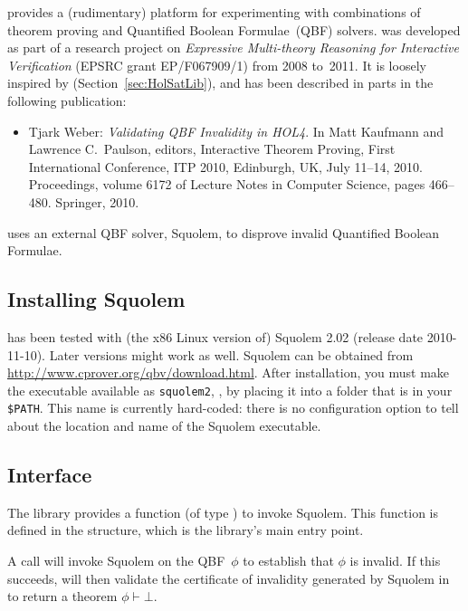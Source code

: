 
\setcounter{sessioncount}{0}

 provides a (rudimentary) platform for experimenting
with combinations of theorem proving and Quantified Boolean
Formulae~(QBF) solvers.   was developed as part of a
research project on {\it Expressive Multi-theory Reasoning for
  Interactive Verification} (EPSRC grant EP/F067909/1) from 2008
to~2011.  It is loosely inspired by 
(Section~\ref{sec:HolSatLib}), and has been described in parts in the
following publication:
\begin{itemize}
\item Tjark Weber: {\it Validating QBF Invalidity in HOL4}.  In Matt
  Kaufmann and Lawrence C.\ Paulson, editors, Interactive Theorem
  Proving, First International Conference, ITP 2010, Edinburgh, UK,
  July 11--14, 2010.  Proceedings, volume 6172 of Lecture Notes in
  Computer Science, pages 466--480.  Springer, 2010.
\end{itemize}
 uses an external QBF solver, Squolem, to disprove
invalid Quantified Boolean Formulae.

\subsection{Installing Squolem}

 has been tested with (the x86 Linux version of) Squolem
2.02 (release date 2010-11-10).  Later versions might work as well.
Squolem can be obtained from
\url{http://www.cprover.org/qbv/download.html}.  After installation,
you must make the executable available as {\tt squolem2}, \eg, by
placing it into a folder that is in your {\tt \$PATH}.  This name is
currently hard-coded: there is no configuration option to tell \HOL{}
about the location and name of the Squolem executable.

\subsection{Interface}
\label{qbf-interface}

The library provides a function  (of type ) to invoke Squolem.  This function is defined in the
 structure, which is the library's main entry point.

A call  will invoke Squolem on the QBF~$\phi$ to
establish that $\phi$ is invalid.  If this succeeds, 
will then validate the certificate of invalidity generated by Squolem
in \HOL{} to return a theorem $\phi \vdash \bot$.

